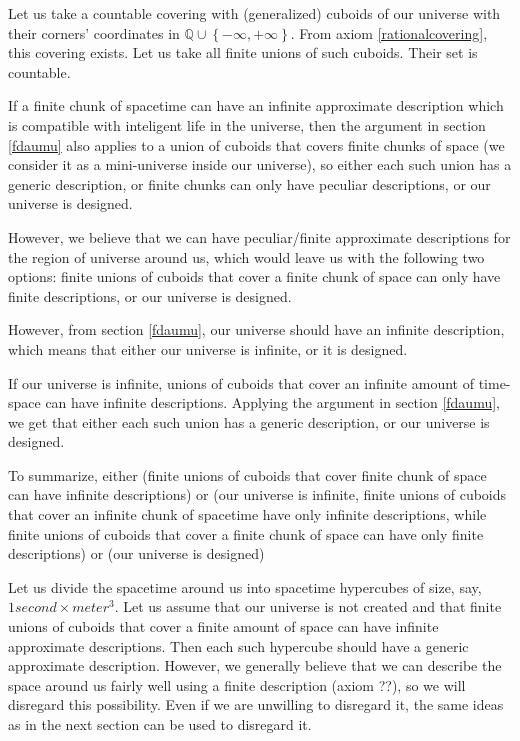 \documentclass[a4paper
,draft
]{article}
\def\rationale{\mathbb{Q}}
\newcommand{\multime}[1]{\left\{ #1 \right\}}
\begin{document}
Let us take a countable covering with (generalized) cuboids of our universe
with their corners' coordinates in $\rationale\cup\multime{-\infty, +\infty}$.
From axiom \ref{rationalcovering}, this covering exists.
Let us take all finite unions of such cuboids. Their set is countable.

If a finite chunk of spacetime can have an infinite approximate
description which is compatible with inteligent life in the universe, then the
argument in section \ref{fdaumu} also applies to a union of cuboids that covers
finite chunks of space (we consider it as a mini-universe inside
our universe), so either each such union has a generic description,
or finite chunks can only have peculiar descriptions, or our universe
is designed.

However, we believe that we can have peculiar/finite approximate descriptions
for the region of universe around us, which would leave us with the following
two options: finite unions of cuboids that cover a finite chunk of space can
only have finite descriptions, or our universe is designed.

However, from section \ref{fdaumu}, our universe should have an
infinite description, which means that either our universe is infinite,
or it is designed.

If our universe is infinite, unions of cuboids that cover an infinite
amount of time-space can have infinite descriptions. Applying the argument
in section \ref{fdaumu}, we get that either each such union has a generic
description, or our universe is designed.

To summarize, either (finite unions of cuboids that cover finite chunk of space
can have infinite descriptions) or (our universe is infinite, finite unions of
cuboids that cover an infinite chunk of spacetime have only infinite
descriptions, while finite unions of cuboids that cover a finite chunk of
space can have only finite descriptions) or (our universe is designed)

Let us divide the spacetime around us into spacetime hypercubes of size, say,
$1 second \times meter^3$. Let us assume that our universe is not created
and that finite unions of cuboids that cover a finite amount of space
can have infinite approximate descriptions. Then each such hypercube should
have a generic approximate description. However, we generally believe that
we can describe the space around us fairly well using a finite description
(axiom ??), so we will disregard this possibility. Even if we are unwilling
to disregard it, the same ideas as in the next section can be used to
disregard it.
\end{document}
